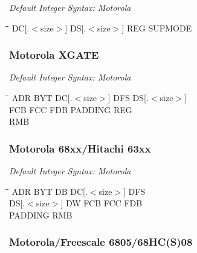 {\em Default Integer Syntax: Motorola}

{\tt\begin{tabbing}
\hspace{3cm}\=\hspace{3cm}\=\hspace{3cm}\=\hspace{3cm}\=\kill
DC[.$<$size$>$] \> DS[.$<$size$>$] \> REG \> SUPMODE \\
\end{tabbing}}

\subsubsection{Motorola XGATE}

{\em Default Integer Syntax: Motorola}

{\tt\begin{tabbing}
\hspace{3cm}\=\hspace{3cm}\=\hspace{3cm}\=\hspace{3cm}\=\kill
ADR        \> BYT         \> DC[.$<$size$>$] \> DFS     \> DS[.$<$size$>$] \\
FCB        \> FCC         \> FDB         \> PADDING     \> REG \\
RMB \\
\end{tabbing}}

\subsubsection{Motorola 68xx/Hitachi 63xx}

{\em Default Integer Syntax: Motorola}

{\tt\begin{tabbing}
\hspace{3cm}\=\hspace{3cm}\=\hspace{3cm}\=\hspace{3cm}\=\kill
ADR        \> BYT         \> DB          \> DC[.$<$size$>$] \> DFS     \\
DS[.$<$size$>$] \> DW     \> FCB         \> FCC         \> FDB         \\
PADDING     \> RMB \\
\end{tabbing}}

\subsubsection{Motorola/Freescale 6805/68HC(S)08}

